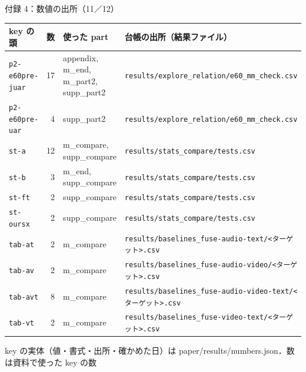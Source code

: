 \begin{frame}{付録 4：数値の出所（11／12）}
  \vspace{-0.3em}\centering\tiny\renewcommand{\arraystretch}{1.0}
  \begin{tabularx}{\textwidth}{@{}l r l X@{}}
    \toprule key の頭 & 数 & 使った part & 台帳の出所（結果ファイル） \\ \midrule
    \texttt{p2-e60pre-juar} & 17 & appendix, m\_end, m\_part2, supp\_part2 & \texttt{results/\allowbreak{}explore\_\allowbreak{}relation/\allowbreak{}e60\_\allowbreak{}mm\_\allowbreak{}check.csv} \\
    \texttt{p2-e60pre-uar} & 4 & supp\_part2 & \texttt{results/\allowbreak{}explore\_\allowbreak{}relation/\allowbreak{}e60\_\allowbreak{}mm\_\allowbreak{}check.csv} \\
    \texttt{st-a} & 12 & m\_compare, supp\_compare & \texttt{results/\allowbreak{}stats\_\allowbreak{}compare/\allowbreak{}tests.csv} \\
    \texttt{st-b} & 3 & m\_end, supp\_compare & \texttt{results/\allowbreak{}stats\_\allowbreak{}compare/\allowbreak{}tests.csv} \\
    \texttt{st-ft} & 2 & supp\_compare & \texttt{results/\allowbreak{}stats\_\allowbreak{}compare/\allowbreak{}tests.csv} \\
    \texttt{st-oursx} & 2 & supp\_compare & \texttt{results/\allowbreak{}stats\_\allowbreak{}compare/\allowbreak{}tests.csv} \\
    \texttt{tab-at} & 2 & m\_compare & \texttt{results/\allowbreak{}baselines\_\allowbreak{}fuse-audio-text/\allowbreak{}<ターゲット>.csv} \\
    \texttt{tab-av} & 2 & m\_compare & \texttt{results/\allowbreak{}baselines\_\allowbreak{}fuse-audio-video/\allowbreak{}<ターゲット>.csv} \\
    \texttt{tab-avt} & 8 & m\_compare & \texttt{results/\allowbreak{}baselines\_\allowbreak{}fuse-audio-video-text/\allowbreak{}<ターゲット>.csv} \\
    \texttt{tab-vt} & 2 & m\_compare & \texttt{results/\allowbreak{}baselines\_\allowbreak{}fuse-video-text/\allowbreak{}<ターゲット>.csv} \\
    \bottomrule
  \end{tabularx}\par
  {\raggedright\tiny key の実体（値・書式・出所・確かめた日）は paper/results/numbers.json．数は資料で使った key の数\par}
\end{frame}
